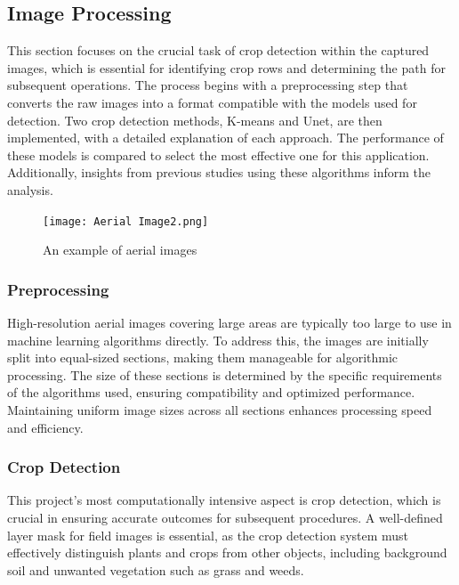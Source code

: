 \documentclass[conference]{IEEEtran}
\begin{document}
\subsection{Image Processing}
This section focuses on the crucial task of crop detection within the captured images, which is essential for identifying crop rows and determining the path for subsequent operations. The process begins with a preprocessing step that converts the raw images into a format compatible with the models used for detection. Two crop detection methods, K-means and Unet, are then implemented, with a detailed explanation of each approach. The performance of these models is compared to select the most effective one for this application. Additionally, insights from previous studies using these algorithms inform the analysis.

\begin{figure}[htbp]
\texttt{[image: Aerial Image2.png]}
\caption{An example of aerial images}
\label{fig1}
\end{figure}

\subsubsection{Preprocessing}
High-resolution aerial images covering large areas are typically too large to use in machine learning algorithms directly. To address this, the images are initially split into equal-sized sections, making them manageable for algorithmic processing. The size of these sections is determined by the specific requirements of the algorithms used, ensuring compatibility and optimized performance. Maintaining uniform image sizes across all sections enhances processing speed and efficiency.

\subsubsection{Crop Detection}
This project's most computationally intensive aspect is crop detection, which is crucial in ensuring accurate outcomes for subsequent procedures. A well-defined layer mask for field images is essential, as the crop detection system must effectively distinguish plants and crops from other objects, including background soil and unwanted vegetation such as grass and weeds. 
\end{document}
